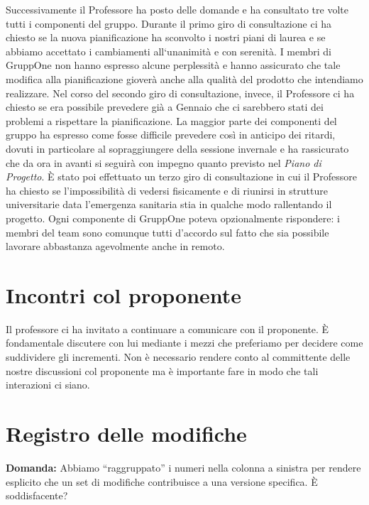 \documentclass{article}
\begin{document}
Successivamente il Professore ha posto delle domande e ha consultato tre volte tutti i componenti del gruppo.
Durante il primo giro di consultazione ci ha chiesto se la nuova pianificazione ha sconvolto i nostri piani di laurea e se abbiamo accettato i cambiamenti all`unanimità e con serenità.
I membri di GruppOne non hanno espresso alcune perplessità e hanno assicurato che tale modifica alla pianificazione gioverà anche alla qualità del prodotto che intendiamo realizzare.
Nel corso del secondo giro di consultazione, invece, il Professore ci ha chiesto se era possibile prevedere già a Gennaio che ci sarebbero stati dei problemi a rispettare la pianificazione.
La maggior parte dei componenti del gruppo ha espresso come fosse difficile prevedere così in anticipo dei ritardi, dovuti in particolare al sopraggiungere della sessione invernale e ha rassicurato che da ora in avanti si seguirà con impegno quanto previsto nel \textit{Piano di Progetto}.
È stato poi effettuato un terzo giro di consultazione in cui il Professore ha chiesto se l'impossibilità di vedersi fisicamente e di riunirsi in strutture universitarie data l'emergenza sanitaria stia in qualche modo rallentando il progetto. Ogni componente di GruppOne poteva opzionalmente rispondere: i membri del team sono comunque tutti d'accordo sul fatto che sia possibile lavorare abbastanza agevolmente anche in remoto.

\section{Incontri col proponente}%
\label{sec:incontri_col_proponente}

Il professore ci ha invitato a continuare a comunicare con il proponente.
È fondamentale discutere con lui mediante i mezzi che preferiamo per decidere come suddividere gli incrementi.
Non è necessario rendere conto al committente delle nostre discussioni col proponente ma è importante fare in modo che tali interazioni ci siano.

\section{Registro delle modifiche}%
\label{sec:registro_delle_modifiche}

\textbf{Domanda:} Abbiamo ``raggruppato'' i numeri nella colonna a sinistra per rendere esplicito che un set di modifiche contribuisce a una versione specifica. È soddisfacente?\\
\end{document}
